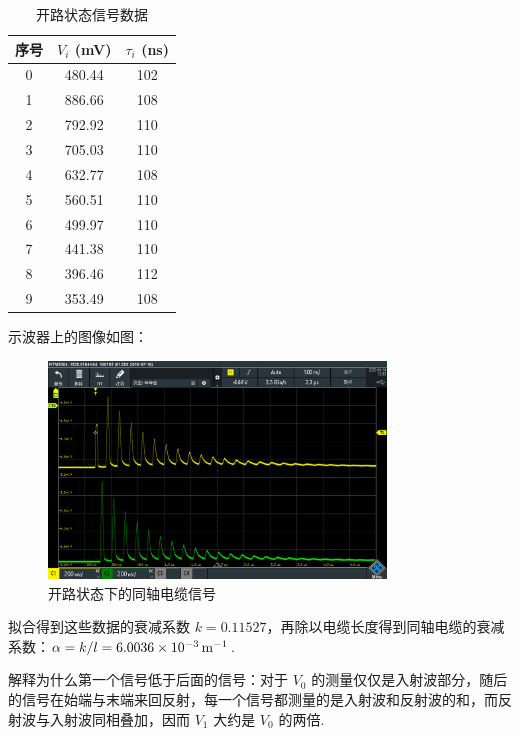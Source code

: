 \documentclass{customDoc}
\begin{document}
\begin{table}[htbp]
  \centering
  \caption{开路状态信号数据}
    \begin{tabular}{|c|c|c|}
    \hline
    序号    & $V_i$ (\si{\milli\volt}) & $\tau_i$ (\si{\nano\second}) \\
    \hline
    0     & 480.44 & 102 \\
    \hline
    1     & 886.66 & 108 \\
    \hline
    2     & 792.92 & 110 \\
    \hline
    3     & 705.03 & 110 \\
    \hline
    4     & 632.77 & 108 \\
    \hline
    5     & 560.51 & 110 \\
    \hline
    6     & 499.97 & 110 \\
    \hline
    7     & 441.38 & 110 \\
    \hline
    8     & 396.46 & 112 \\
    \hline
    9     & 353.49 & 108 \\
    \hline
    \end{tabular}
\end{table}

示波器上的图像如图：

\begin{figure}[H]
    \centering
    \includegraphics[width=0.8\textwidth]{SCR07.PNG}
    \caption{开路状态下的同轴电缆信号}
    \label{fig:open_circuit}
\end{figure}

拟合得到这些数据的衰减系数 $k = 0.11527$，再除以电缆长度得到同轴电缆的衰减系数：$\alpha = k / l = \SI{6.0036E-3}{\metre}^{-1}$.

解释为什么第一个信号低于后面的信号：对于 $V_0$ 的测量仅仅是入射波部分，随后的信号在始端与末端来回反射，每一个信号都测量的是入射波和反射波的和，而反射波与入射波同相叠加，因而 $V_1$ 大约是 $V_0$ 的两倍.
\end{document}
